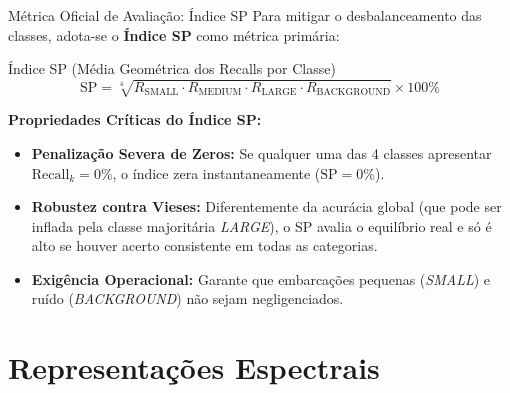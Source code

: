 \documentclass[aspectratio=169]{beamer}
\begin{document}
\begin{frame}{M\'{e}trica Oficial de Avalia\c{c}\~{a}o: \'{I}ndice SP}
    \small
    Para mitigar o desbalanceamento das classes, adota-se o \textbf{\'{I}ndice SP} como m\'{e}trica prim\'{a}ria:
    
    \begin{block}{\'{I}ndice SP (M\'{e}dia Geom\'{e}trica dos Recalls por Classe)}
    \small
    \[
        \text{SP} = \sqrt[4]{R_{\text{SMALL}} \cdot R_{\text{MEDIUM}} \cdot R_{\text{LARGE}} \cdot R_{\text{BACKGROUND}}} \times 100\%
    \]
    \end{block}
    
    \footnotesize
    \textbf{Propriedades Cr\'{i}ticas do \'{I}ndice SP:}
    \begin{itemize}
        \item \textbf{Penaliza\c{c}\~{a}o Severa de Zeros:} Se qualquer uma das 4 classes apresentar $\text{Recall}_k = 0\%$, o \'{i}ndice zera instantaneamente ($\text{SP} = 0\%$).
        \item \textbf{Robustez contra Vieses:} Diferentemente da acur\'{a}cia global (que pode ser inflada pela classe majorit\'{a}ria \textit{LARGE}), o SP avalia o equil\'{i}brio real e s\'{o} \'{e} alto se houver acerto consistente em todas as categorias.
        \item \textbf{Exig\^{e}ncia Operacional:} Garante que embarca\c{c}\~{o}es pequenas (\textit{SMALL}) e ru\'{i}do (\textit{BACKGROUND}) n\~{a}o sejam negligenciados.
    \end{itemize}
\end{frame}

\section{Representa\c{c}\~{o}es Espectrais}
\end{document}
